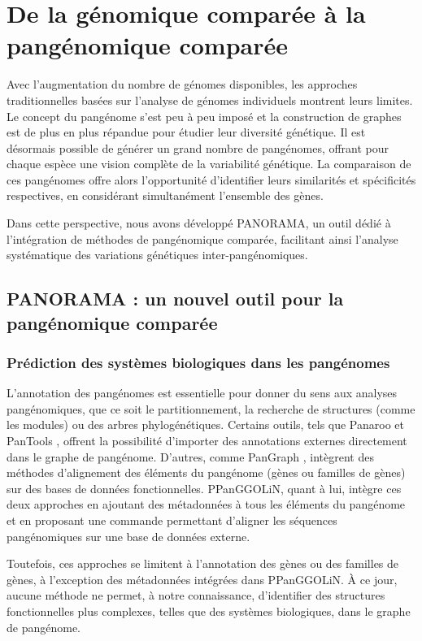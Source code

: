 \part{De la génomique comparée à la pangénomique comparée}
\label{part:PANORAMA}

Avec l’augmentation du nombre de génomes disponibles, les approches traditionnelles basées sur l’analyse de génomes individuels montrent leurs limites. Le concept du pangénome s'est peu à peu imposé et la construction de graphes est de plus en plus répandue pour étudier leur diversité génétique. Il est désormais possible de générer un grand nombre de pangénomes, offrant pour chaque espèce une vision complète de la variabilité génétique. La comparaison de ces pangénomes offre alors l’opportunité d’identifier leurs similarités et spécificités respectives, en considérant simultanément l’ensemble des gènes.

Dans cette perspective, nous avons développé PANORAMA, un outil dédié à l’intégration de méthodes de pangénomique comparée, facilitant ainsi l’analyse systématique des variations génétiques inter-pangénomiques.

\chapter{PANORAMA : un nouvel outil pour la pangénomique comparée}
\section{Prédiction des systèmes biologiques dans les pangénomes}

L’annotation des pangénomes est essentielle pour donner du sens aux analyses pangénomiques, que ce soit le partitionnement, la recherche de structures (comme les modules) ou des arbres phylogénétiques. Certains outils, tels que Panaroo \cite{tonkin-hill_producing_2020} et PanTools \cite{sheikhizadeh_pantools_2016}, offrent la possibilité d’importer des annotations externes directement dans le graphe de pangénome. D’autres, comme PanGraph \cite{noll_pangraph_2023}, intègrent des méthodes d’alignement des éléments du pangénome (gènes ou familles de gènes) sur des bases de données fonctionnelles. PPanGGOLiN, quant à lui, intègre ces deux approches en ajoutant des métadonnées à tous les éléments du pangénome et en proposant une commande permettant d’aligner les séquences pangénomiques sur une base de données externe.

Toutefois, ces approches se limitent à l’annotation des gènes ou des familles de gènes, à l’exception des métadonnées intégrées dans PPanGGOLiN. À ce jour, aucune méthode ne permet, à notre connaissance, d’identifier des structures fonctionnelles plus complexes, telles que des systèmes biologiques, dans le graphe de pangénome.

